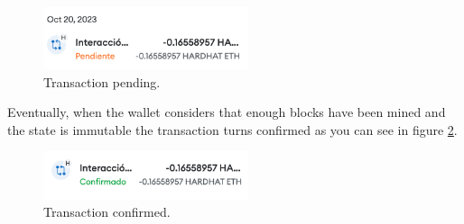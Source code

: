 {\begin{figure}[H]
\centering
\includegraphics[width=6cm]{img/results/transaction-pending.png}
\caption[Insurechain: Transaction pending]{\footnotesize{Transaction pending.}}
\label{fig:pending-transaction}
\end{figure}
Eventually, when the wallet considers that enough blocks have been mined and the state is immutable the transaction turns confirmed as you can see in figure \ref{fig:confirmed-transaction}.

\begin{figure}[H]
\centering
\includegraphics[width=6cm]{img/results/transaction-confirmed.png}
\caption[Insurechain: Transaction confirmed]{\footnotesize{Transaction confirmed.}}
\label{fig:confirmed-transaction}
\end{figure}
}

